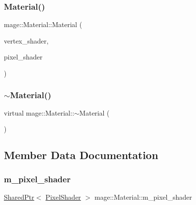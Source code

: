\subsubsection{\texorpdfstring{Material()}{Material()}}
{\footnotesize\ttfamily mage\+::\+Material\+::\+Material (\begin{DoxyParamCaption}\item[{\hyperlink{namespacemage_a1e01ae66713838a7a67d30e44c67703e}{Shared\+Ptr}$<$ \hyperlink{classmage_1_1_vertex_shader}{Vertex\+Shader} $>$}]{vertex\+\_\+shader,  }\item[{\hyperlink{namespacemage_a1e01ae66713838a7a67d30e44c67703e}{Shared\+Ptr}$<$ \hyperlink{classmage_1_1_pixel_shader}{Pixel\+Shader} $>$}]{pixel\+\_\+shader }\end{DoxyParamCaption})}

\hypertarget{classmage_1_1_material_a536bc060adb4a43607f2469f81dc5ce3}{}\label{classmage_1_1_material_a536bc060adb4a43607f2469f81dc5ce3} 
\subsubsection{\texorpdfstring{$\sim$\+Material()}{~Material()}}
{\footnotesize\ttfamily virtual mage\+::\+Material\+::$\sim$\+Material (\begin{DoxyParamCaption}{ }\end{DoxyParamCaption})\hspace{0.3cm}{\ttfamily [virtual]}}



\subsection{Member Data Documentation}
\hypertarget{classmage_1_1_material_a2c8cc11322217b70c0cdab7de5188f3d}{}\label{classmage_1_1_material_a2c8cc11322217b70c0cdab7de5188f3d} 
\subsubsection{\texorpdfstring{m\+\_\+pixel\+\_\+shader}{m\_pixel\_shader}}
{\footnotesize\ttfamily \hyperlink{namespacemage_a1e01ae66713838a7a67d30e44c67703e}{Shared\+Ptr}$<$ \hyperlink{classmage_1_1_pixel_shader}{Pixel\+Shader} $>$ mage\+::\+Material\+::m\+\_\+pixel\+\_\+shader\hspace{0.3cm}{\ttfamily [protected]}}

